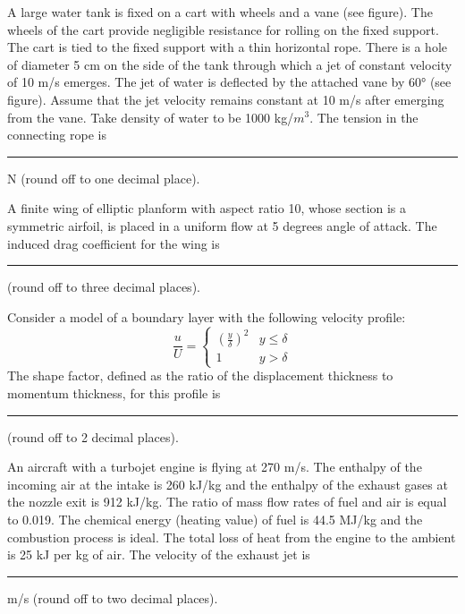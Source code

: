 \iffalse
\chapter{2021}
\author{AI24BTECH11012}
\section{ae}
\fi
    \item A large water tank is fixed on a cart with wheels and a vane (see figure). The wheels of the cart provide negligible resistance for rolling on the fixed support. The cart is tied to the fixed support with a thin horizontal rope. There is a hole of diameter 5 cm on the side of the tank through which a jet of constant velocity of 10 m/s emerges. The jet of water is deflected by the attached vane by 60° (see figure). Assume that the jet velocity remains constant at 10 m/s after emerging from the vane. Take density of water to be 1000 kg/$m^3$. The tension in the connecting rope is \rule{1.5cm}{0.4pt} N (round off to one decimal place).
    
    \item A finite wing of elliptic planform with aspect ratio 10, whose section is a symmetric airfoil, is placed in a uniform flow at 5 degrees angle of attack. The induced drag coefficient for the wing is \rule{1.5cm}{0.4pt} (round off to three decimal places).
    
    \item Consider a model of a boundary layer with the following velocity profile:
\[
\frac{u}{U} = 
\begin{cases} 
\left( \frac{y}{\delta} \right)^2 & y \leq \delta \\ 
1 & y > \delta 
\end{cases}
\]
The shape factor, defined as the ratio of the displacement thickness to momentum thickness, for this profile is \rule{1.5cm}{0.4pt}  (round off to 2 decimal places).

\item An aircraft with a turbojet engine is flying at 270 m/s. The enthalpy of the incoming air at the intake is 260 kJ/kg and the enthalpy of the exhaust gases at the nozzle exit is 912 kJ/kg. The ratio of mass flow rates of fuel and air is equal to 0.019. The chemical energy (heating value) of fuel is 44.5 MJ/kg and the combustion process is ideal. The total loss of heat from the engine to the ambient is 25 kJ per kg of air. The velocity of the exhaust jet is \rule{1.5cm}{0.4pt} m/s (round off to two decimal places).

